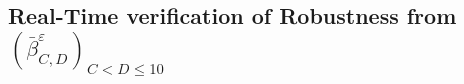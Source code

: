 \subsection{Real-Time verification of Robustness from 
$(\bar{\beta}^\varepsilon_{C,D})_{C<D \leq 10}$}

\label{sec:realtime}


